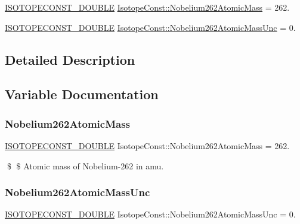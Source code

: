 \begin{DoxyCompactItemize}
\item 
\mbox{\hyperlink{group___isotope_const-_macros_ga8f45a7272ce02c0b4c65c44636ed719a}{I\+S\+O\+T\+O\+P\+E\+C\+O\+N\+S\+T\+\_\+\+D\+O\+U\+B\+LE}} \mbox{\hyperlink{group___isotope_const-_nobelium-_no262_gaba925b99624ecb543948d84cc97c599c}{Isotope\+Const\+::\+Nobelium262\+Atomic\+Mass}} = 262.
\item 
\mbox{\hyperlink{group___isotope_const-_macros_ga8f45a7272ce02c0b4c65c44636ed719a}{I\+S\+O\+T\+O\+P\+E\+C\+O\+N\+S\+T\+\_\+\+D\+O\+U\+B\+LE}} \mbox{\hyperlink{group___isotope_const-_nobelium-_no262_ga1c816705b712cd1f43c04fabd0eafefe}{Isotope\+Const\+::\+Nobelium262\+Atomic\+Mass\+Unc}} = 0.
\end{DoxyCompactItemize}


\subsection{Detailed Description}


\subsection{Variable Documentation}
\mbox{\label{group___isotope_const-_nobelium-_no262_gaba925b99624ecb543948d84cc97c599c}} 
\subsubsection{\texorpdfstring{Nobelium262\+Atomic\+Mass}{Nobelium262AtomicMass}}
{\footnotesize\ttfamily \mbox{\hyperlink{group___isotope_const-_macros_ga8f45a7272ce02c0b4c65c44636ed719a}{I\+S\+O\+T\+O\+P\+E\+C\+O\+N\+S\+T\+\_\+\+D\+O\+U\+B\+LE}} Isotope\+Const\+::\+Nobelium262\+Atomic\+Mass = 262.}

\$ \$ Atomic mass of Nobelium-\/262 in amu. \mbox{\label{group___isotope_const-_nobelium-_no262_ga1c816705b712cd1f43c04fabd0eafefe}} 
\subsubsection{\texorpdfstring{Nobelium262\+Atomic\+Mass\+Unc}{Nobelium262AtomicMassUnc}}
{\footnotesize\ttfamily \mbox{\hyperlink{group___isotope_const-_macros_ga8f45a7272ce02c0b4c65c44636ed719a}{I\+S\+O\+T\+O\+P\+E\+C\+O\+N\+S\+T\+\_\+\+D\+O\+U\+B\+LE}} Isotope\+Const\+::\+Nobelium262\+Atomic\+Mass\+Unc = 0.}

